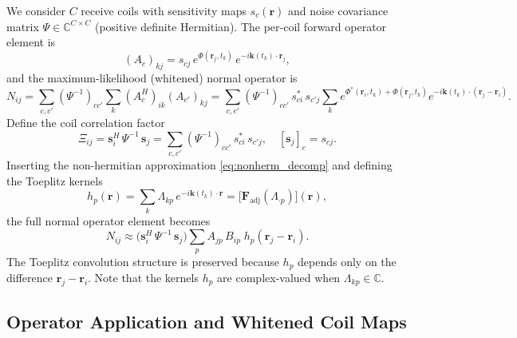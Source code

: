 \documentclass{article}
\begin{document}
We consider $C$ receive coils with sensitivity maps $s_c(\mathbf{r})$ and noise covariance matrix $\Psi \in \mathbb{C}^{C \times C}$ (positive definite Hermitian).
The per-coil forward operator element is
\begin{equation}
    (A_c)_{kj} = s_{cj}\,e^{\Phi(\mathbf{r}_j, t_k)}\,e^{-i\mathbf{k}(t_k)\cdot\mathbf{r}_j},
\end{equation}
and the maximum-likelihood (whitened) normal operator is
\begin{equation}
    N_{ij}
    = \sum_{c,c'} (\Psi^{-1})_{cc'} \sum_k (A_c^H)_{ik}(A_{c'})_{kj}
    = \sum_{c,c'} (\Psi^{-1})_{cc'}\,s^*_{ci}\,s_{c'j}
      \sum_k e^{\Phi^*(\mathbf{r}_i,t_k)+\Phi(\mathbf{r}_j,t_k)}
             e^{-i\mathbf{k}(t_k)\cdot(\mathbf{r}_j - \mathbf{r}_i)}.
\end{equation}
Define the coil correlation factor
\begin{equation}
    \Xi_{ij}
    = \mathbf{s}_i^H\,\Psi^{-1}\,\mathbf{s}_j
    = \sum_{c,c'} (\Psi^{-1})_{cc'}\,s^*_{ci}\,s_{c'j},
    \quad [\mathbf{s}_j]_c = s_{cj}.
\end{equation}
Inserting the non-hermitian approximation \eqref{eq:nonherm_decomp} and defining the Toeplitz kernels
\begin{equation}
    h_p(\mathbf{r}) = \sum_k \Lambda_{kp}\,e^{-i\mathbf{k}(t_k)\cdot\mathbf{r}}
    = \bigl[\mathbf{F}_{\mathrm{adj}}(\Lambda_{\cdot p})\bigr](\mathbf{r}),
    \label{eq:nonherm_kernel}
\end{equation}
the full normal operator element becomes
\begin{equation}
    N_{ij}
    \approx
    \bigl(\mathbf{s}_i^H\,\Psi^{-1}\,\mathbf{s}_j\bigr)
    \sum_p A_{jp}\,B_{ip}\;h_p(\mathbf{r}_j - \mathbf{r}_i).
    \label{eq:nonherm_N}
\end{equation}
The Toeplitz convolution structure is preserved because $h_p$ depends only on the difference $\mathbf{r}_j - \mathbf{r}_i$.
Note that the kernels $h_p$ are complex-valued when $\Lambda_{kp} \in \mathbb{C}$.

\subsection{Operator Application and Whitened Coil Maps}
\end{document}
